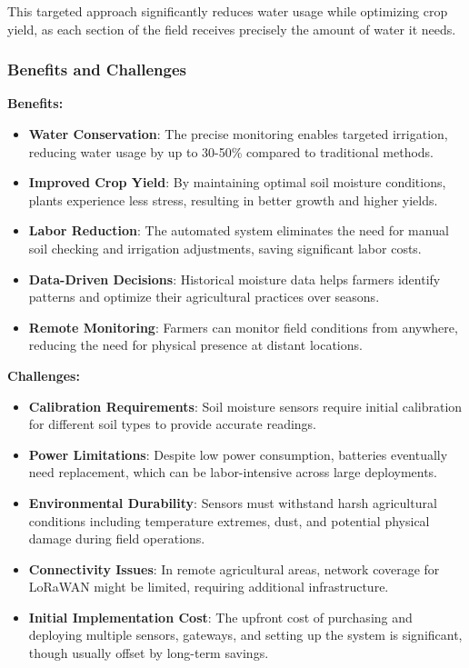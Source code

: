 \documentclass[12pt,a4paper]{article}
\begin{document}
This targeted approach significantly reduces water usage while optimizing crop yield, as each section of the field receives precisely the amount of water it needs.

\subsubsection{Benefits and Challenges}

\textbf{Benefits:}
\begin{itemize}
    \item \textbf{Water Conservation}: The precise monitoring enables targeted irrigation, reducing water usage by up to 30-50\% compared to traditional methods.
    \item \textbf{Improved Crop Yield}: By maintaining optimal soil moisture conditions, plants experience less stress, resulting in better growth and higher yields.
    \item \textbf{Labor Reduction}: The automated system eliminates the need for manual soil checking and irrigation adjustments, saving significant labor costs.
    \item \textbf{Data-Driven Decisions}: Historical moisture data helps farmers identify patterns and optimize their agricultural practices over seasons.
    \item \textbf{Remote Monitoring}: Farmers can monitor field conditions from anywhere, reducing the need for physical presence at distant locations.
\end{itemize}

\textbf{Challenges:}
\begin{itemize}
    \item \textbf{Calibration Requirements}: Soil moisture sensors require initial calibration for different soil types to provide accurate readings.
    \item \textbf{Power Limitations}: Despite low power consumption, batteries eventually need replacement, which can be labor-intensive across large deployments.
    \item \textbf{Environmental Durability}: Sensors must withstand harsh agricultural conditions including temperature extremes, dust, and potential physical damage during field operations.
    \item \textbf{Connectivity Issues}: In remote agricultural areas, network coverage for LoRaWAN might be limited, requiring additional infrastructure.
    \item \textbf{Initial Implementation Cost}: The upfront cost of purchasing and deploying multiple sensors, gateways, and setting up the system is significant, though usually offset by long-term savings.
\end{itemize}
\end{document}
